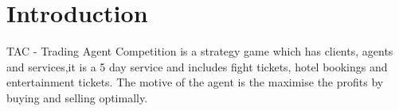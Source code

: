 \section{Introduction}

TAC - Trading Agent Competition is a strategy game which has clients, agents and services,it is a 5 day service and includes fight tickets, hotel bookings and entertainment tickets. The motive of the agent is the maximise the profits by buying and selling optimally. 